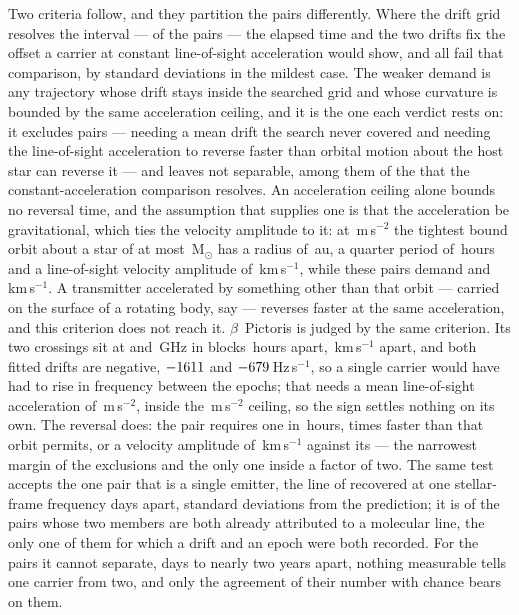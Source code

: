 Two criteria follow, and they partition the pairs differently. Where the drift
grid resolves the interval --- \TjNPower{} of the \TjNPair{} pairs --- the
elapsed time and the two drifts fix the offset a carrier at constant
line-of-sight acceleration would show, and all \TjNPower{} fail that
comparison, by \TjSigMin{} standard deviations in the mildest case. The weaker
demand is any trajectory whose drift stays inside the searched grid and whose
curvature is bounded by the same acceleration ceiling, and it is the one each
verdict rests on: it excludes \TjNExcl{} pairs ---
\TjNExclGrid{} needing a mean drift the search never covered and
\TjNExclTau{} needing the line-of-sight acceleration to reverse faster than
orbital motion about the host star can reverse it --- and leaves \TjNOpen{}
not separable, among them \TjNPowerOpen{} of the \TjNPower{} that the
constant-acceleration comparison resolves. An acceleration ceiling alone
bounds no reversal time, and the assumption that supplies one is that the
acceleration be gravitational, which ties the velocity amplitude to it: at
\WdAGrid\,m\,s$^{-2}$ the tightest bound orbit about a star of at most
\TjMassMax\,M$_\odot$ has a radius of \TjROrbAu\,au, a quarter period of
\TjTauOrbH\,hours and a line-of-sight velocity amplitude of
\TjVorbKms\,km\,s$^{-1}$, while these \TjNExclTau{} pairs demand
\TjVampHi{} and \TjVampLo\,km\,s$^{-1}$. A transmitter accelerated by
something other than that orbit --- carried on the surface of a rotating
body, say --- reverses faster at the same acceleration, and this criterion
does not reach it.
$\beta$~Pictoris is judged by the same criterion. Its two crossings sit at
\TjBpNuLo{} and \TjBpNuHi\,GHz in blocks \TjBpDtH\,hours apart,
\TjBpDvKms\,km\,s$^{-1}$ apart, and both fitted drifts are negative,
$-1611$ and $-679$\,Hz\,s$^{-1}$, so a single carrier would have
had to rise in frequency between the epochs; that needs a mean line-of-sight
acceleration of \TjBpAccelReq\,m\,s$^{-2}$, inside the
\WdAGrid\,m\,s$^{-2}$ ceiling, so the sign settles nothing on its own. The
reversal does: the pair requires one in \TjBpTauH\,hours, \TjBpRatio{} times
faster than that orbit permits, or a velocity amplitude of
\TjBpVamp\,km\,s$^{-1}$ against its \TjVorbKms{} --- the narrowest margin of
the \TjNExcl{} exclusions and the only one inside a factor of two. The same
test accepts the one pair that is a single emitter, the \TjCtlLine{} line of
\TjCtlStar{} recovered at one stellar-frame frequency \TjCtlDtD{} days apart,
\TjCtlNSig{} standard deviations from the prediction; it is \TjNCandAttrTest{}
of the \TjNCandAttr{} pairs whose two members are both already attributed to a
molecular line, the only one of them for which a drift and an epoch were both
recorded. For the \TjNOpen{} pairs
it cannot
separate, \TjDtOpenMinD{} days to nearly two years apart, nothing measurable
tells one carrier from two, and only the agreement of their number with
chance bears on them.

